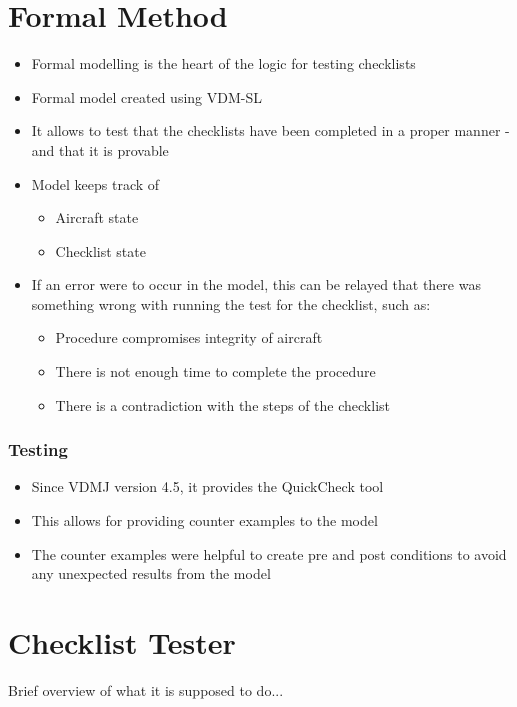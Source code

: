 \documentclass[../dissertation.tex]{subfiles}
\begin{document}
\section{Formal Method}
\begin{itemize}
  \item Formal modelling is the heart of the logic for testing checklists
  \item Formal model created using VDM-SL
  \item It allows to test that the checklists have been completed in a proper manner
    - and that it is provable
  \item Model keeps track of
    \begin{itemize}
      \item Aircraft state
      \item Checklist state
    \end{itemize}
  \item If an error were to occur in the model, this can be relayed that there was
    something wrong with running the test for the checklist, such as:
    \begin{itemize}
      \item Procedure compromises integrity of aircraft
      \item There is not enough time to complete the procedure
      \item There is a contradiction with the steps of the checklist
    \end{itemize}
\end{itemize}

\subsubsection{Testing}
\begin{itemize}
  \item Since VDMJ version 4.5, it provides the QuickCheck tool
  \item This allows for providing counter examples to the model
  \item The counter examples were helpful to create pre and post conditions
    to avoid any unexpected results from the model
\end{itemize}


\section{Checklist Tester}
Brief overview of what it is supposed to do... %
\end{document}
